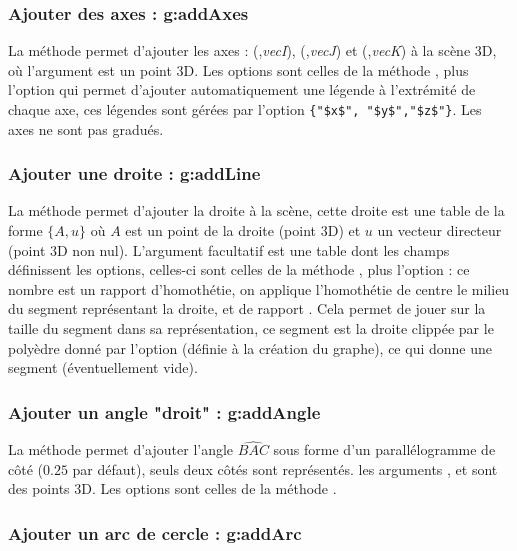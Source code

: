 \subsubsection{Ajouter des axes : g:addAxes}

La méthode  permet d'ajouter les axes : (,\emph{vecI}), (,\emph{vecJ}) et (,\emph{vecK}) à la scène 3D, où l'argument  est un point 3D. Les options sont celles de la méthode , plus l'option  qui permet d'ajouter automatiquement une légende à l'extrémité de chaque axe, ces légendes sont gérées par l'option \verb|{"$x$", "$y$","$z$"}|. Les axes ne sont pas gradués.
    
\subsubsection{Ajouter une droite : g:addLine}

La méthode  permet d'ajouter la droite  à la scène, cette droite est une table de la forme $\{A,u\}$ où $A$ est un point de la droite (point 3D) et $u$ un vecteur directeur (point 3D non nul).  L'argument facultatif  est une table dont les champs définissent les options, celles-ci sont celles de la méthode , plus l'option  : ce nombre est un rapport d'homothétie, on applique l'homothétie de centre le milieu du segment représentant la droite, et de rapport . Cela permet de jouer sur la taille du segment dans sa représentation, ce segment est la droite clippée par le polyèdre donné par l'option  (définie à la création du graphe), ce qui donne une segment (éventuellement vide).

\subsubsection{Ajouter un angle "droit" : g:addAngle}

La méthode  permet d'ajouter l'angle $\widehat{BAC}$ sous forme d'un parallélogramme de côté  ($0.25$ par défaut), seuls deux côtés sont représentés. les arguments ,  et  sont des points 3D. Les options sont celles de la méthode .

\subsubsection{Ajouter un arc de cercle : g:addArc}

